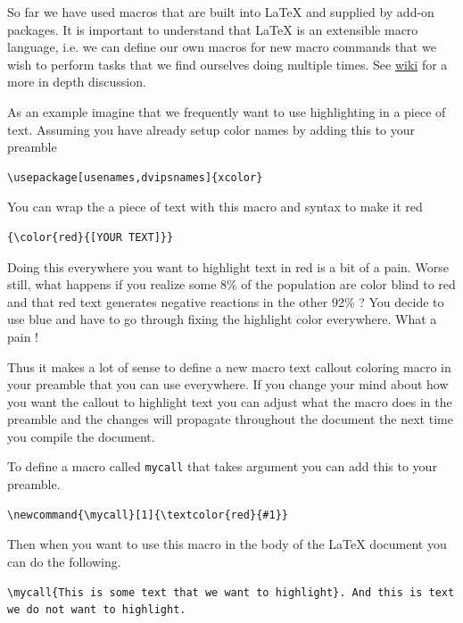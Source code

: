 So far we have used macros that are built into \LaTeX{} and supplied by add-on packages. It is important to understand that \LaTeX{} is an extensible macro language, i.e. we can define our own macros for new macro commands that we wish to perform tasks that we find ourselves doing multiple times. See \href{https://en.wikibooks.org/wiki/LaTeX/Macros}{wiki} for a more in depth discussion.

As an example imagine that we frequently want to use {\color{red}{red}} highlighting in a piece of text. Assuming you have already setup color names by adding this to your preamble  

\begin{verbatim}
\usepackage[usenames,dvipsnames]{xcolor}
\end{verbatim}

You can wrap the a piece of text with this macro and syntax to make it red

\begin{verbatim}
{\color{red}{[YOUR TEXT]}}
\end{verbatim}

Doing this everywhere you want to highlight text in red is a bit of a pain. Worse still, what happens if you realize some 8\% of the population are color blind to red and that red text generates negative reactions in the other 92\% ? You decide to use blue and have to go through fixing the highlight color everywhere. What a pain !

Thus it makes a lot of sense to define a new macro text callout coloring macro in your preamble that you can use everywhere. If you change your mind about how you want the callout to highlight text you can adjust what the macro does in the preamble and the changes will propagate throughout the document the next time you compile the document.

To define a macro called \texttt{mycall} that takes argument you can add this to your preamble.

\begin{verbatim}
\newcommand{\mycall}[1]{\textcolor{red}{#1}}
\end{verbatim}

Then when you want to use this macro in the body of the \LaTeX{} document you can do the following.

\begin{verbatim}
\mycall{This is some text that we want to highlight}. And this is text we do not want to highlight.
\end{verbatim}

